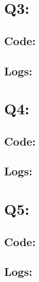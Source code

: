 \documentclass[11pt]{article}
\begin{document}
\section*{Q3:}

\subsection*{Code:}


\subsection*{Logs:}


\section*{Q4:}

\subsection*{Code:}


\subsection*{Logs:}


\section*{Q5:}

\subsection*{Code:}


\subsection*{Logs:}

\end{document}
